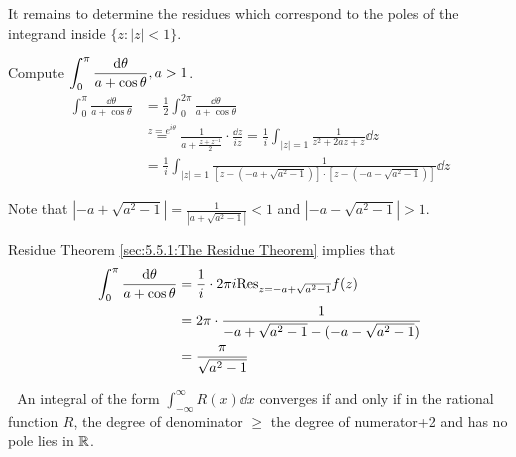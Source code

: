     It remains to determine the residues which correspond to the poles of the integrand inside  $ \{z:|z|<1\} $.
    \begin{example}
        Compute  $ \displaystyle\int_0^\pi\frac{\mathrm{d} \theta }{a+\cos\theta},a>1 $. 
        \begin{equation*}
            \begin{aligned}
                \int_0^\pi \frac{\dd \theta}{a+\cos\theta   }&=\frac{1 }{2}\int_0^{2\pi }\frac{\dd \theta}{a+\cos\theta}\\
                &\overset{z=e^{i\theta }}{=}\frac{1}{a+\frac{z+z^{-1}}{2}}\cdot\frac{\dd z }{iz}=\frac{1 }{i }\int_{|z|=1}\frac{1 }{z^2+2az+z}\dd z\\
                &=\frac{1 }{i }\int_{|z|=1}\frac{1}{\left[z-(-a+\sqrt{a^2-1})\right]\cdot\left[z-(-a-\sqrt{a^2-1})\right]}\dd z
            \end{aligned}
        \end{equation*}
        
        Note that  $ |-a+\sqrt{a^2-1}|=\frac{1 }{|a+\sqrt{a^2-1}|}<1 $ and  $ |-a-\sqrt{a^2-1}|>1 $.

        Residue Theorem \ref{sec:5.5.1:The Residue Theorem} implies that 
        \begin{align*}
            \int_0^\pi \frac{\mathrm{d} \theta }{a+\cos\theta}&=\frac{1 }{i }\cdot 2\pi i\mathrm{Res}_{z=-a+\sqrt{a^2-1}}f(z)\\
            &=2\pi \cdot \frac{1}{-a+\sqrt{a^2-1}-(-a-\sqrt{a^2-1})}\\
            &=\frac{\pi    }{\sqrt{a^2-1}}
        \end{align*}
    \end{example} 
    \noindent{}\,\,\,\,An integral of the form  $ \int_{-\infty}^\infty R(x)\dd x $ converges if and only if in the rational function  $ R $, the degree of denominator  $ \geq $  the degree of numerator+2 and has no pole lies in  $ \mathbb R $.
    
\begin{figure}[!ht]
    \centering
\end{figure}

